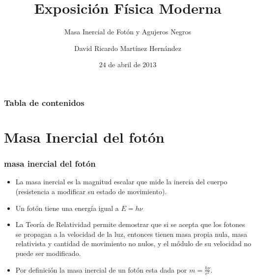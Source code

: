 \documentclass{beamer}
\title[Black Hole]{Exposición Física Moderna}
\subtitle{Masa Inercial de Fotón y Agujeros Negros}
\author[David Martínez]{David Ricardo Martínez Hernández}
\institute[UNAL]{Facultad del Ingeniería\\ Departamento de Eléctrica y Electrónica \\ Universidad Nacional de Colombia}
\date[04/24/13]{$24$ de abril de $2013$}
\begin{document}
\begin{frame}
\titlepage
\end{frame}

\begin{frame}
 \frametitle{Tabla de contenidos}
 \tableofcontents
\end{frame}

\section{Masa Inercial del fotón}
\begin{frame}
 \frametitle{masa inercial del fotón}
 \begin{itemize}
  \item La masa inercial es la magnitud escalar que mide la inercia del cuerpo (resistencia a modificar su estado de movimiento).
  \item Un fotón tiene una energía igual a $E=h \nu$
  \item La Teoría de Relatividad permite demostrar que si se acepta que los fotones se propagan a la velocidad de la luz, entonces tienen masa propia nula, masa relativista y cantidad de movimiento no nulos, y el módulo de su velocidad no puede ser modificado.
  \item Por definición la masa inercial de un fotón esta dada por $m = \frac{h \nu}{c^2}$.
 \end{itemize}
\end{frame}
\end{document}
